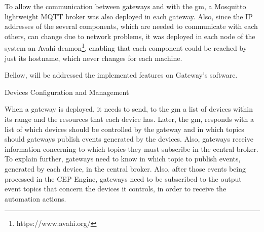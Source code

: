 To allow the communication between gateways and with the \ac{gm}, a Mosquitto lightweight MQTT broker was also deployed in each gateway. Also, since the IP addresses of the several components, which are needed to communicate with each others, can change due to network problems, it was deployed in each node of the system an Avahi deamon\footnote{https://www.avahi.org/}, enabling that each component could be reached by just its hostname, which never changes for each machine.

Bellow, will be addressed the implemented features on Gateway's software.

\begin{Paragraph}{Devices Configuration and Management}

When a gateway is deployed, it needs to send, to the \ac{gm} a list of devices within its range and the resources that each device has. Later, the \ac{gm}, responds with a list of which devices should be controlled by the gateway and in which topics should gateways publish events generated by the devices. Also, gateways receive information concerning to which topics they must subscribe in the central broker. To explain further, gateways need to know in which topic to publish events, generated by each device, in the central broker. Also, after those events being processed in the CEP Engine, gateways need to be subscribed to the output event topics that concern the devices it controls, in order to receive the automation actions.



	
\end{Paragraph}

